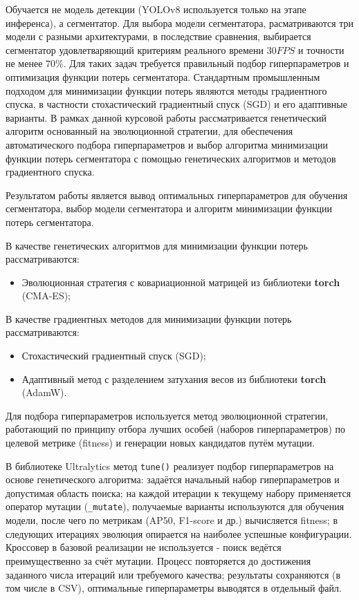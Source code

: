 \documentclass[areasetadvanced]{scrartcl}
\begin{document}
Обучается не модель детекции (YOLOv8 используется только на этапе инференса), а сегментатор. Для выбора модели сегментатора, расматриваются три модели с разными архитектурами, в последствие сравнения, выбирается сегментатор удовлетваряющий критериям реального времени $30 FPS$ и точности не менее $70\%$. Для таких задач требуется правильный подбор гиперпараметров и оптимизация функции потерь сегментатора. Стандартным промышленным подходом для минимизации функции потерь являются методы градиентного спуска, в частности стохастический градиентный спуск (SGD) и его адаптивные варианты. В рамках данной курсовой работы рассматривается генетический алгоритм основанный на эволюционной стратегии, для обеспечения автоматического подбора гиперпараметров и выбор алгоритма минимизации функции потерь сегментатора с помощью генетических алгоритмов и методов градиентного спуска.

Результатом работы является вывод оптимальных гиперпараметров для обучения сегментатора, выбор модели сегментатора и алгоритм минимизации функции потерь сегментатора.

В качестве генетических алгоритмов для минимизации функции потерь рассматриваются:
\begin{itemize}
    \item Эволюционная стратегия с ковариационной матрицей из библиотеки \textbf{torch} (CMA-ES);
\end{itemize}

В качестве градиентных методов для минимизации функции потерь рассматриваются:
\begin{itemize}
    \item Стохастический градиентный спуск (SGD);
    \item Адаптивный метод с разделением затухания весов из библиотеки \textbf{torch} (AdamW).
\end{itemize}

Для подбора гиперпараметров используется метод эволюционной стратегии, работающий по принципу отбора лучших особей (наборов гиперпараметров) по целевой метрике (fitness) и генерации новых кандидатов путём мутации.

В библиотеке Ultralytics метод \texttt{tune()} реализует подбор гиперпараметров на основе генетического алгоритма: задаётся начальный набор гиперпараметров и допустимая область поиска; на каждой итерации к текущему набору применяется оператор мутации (\texttt{\_mutate}), получаемые варианты используются для обучения модели, после чего по метрикам (AP50, F1-score и др.) вычисляется fitness; в следующих итерациях эволюция опирается на наиболее успешные конфигурации. Кроссовер в базовой реализации не используется - поиск ведётся преимущественно за счёт мутации. Процесс повторяется до достижения заданного числа итераций или требуемого качества; результаты сохраняются (в том числе в CSV), оптимальные гиперпараметры выводятся в отдельный файл.
\end{document}
